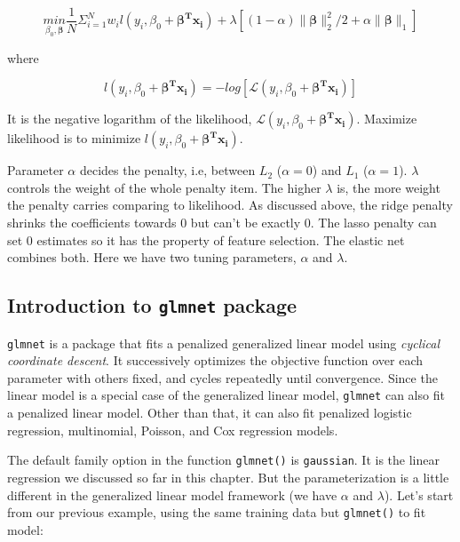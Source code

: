 \documentclass[
  12pt,
]{krantz}
\begin{document}
\[\underset{\beta_{0},\mathbf{\beta}}{min}\frac{1}{N}\Sigma_{i=1}^{N}w_{i}l(y_{i},\beta_{0}+\mathbf{\beta^{T}x_{i}})+\lambda[(1-\alpha)\parallel\mathbf{\beta}\parallel_{2}^{2}/2+\alpha\parallel\mathbf{\beta}\parallel_{1}]\]

where

\[l(y_{i},\beta_{0}+\mathbf{\beta^{T}x_{i}})=-log[\mathcal{L}(y_{i},\beta_{0}+\mathbf{\beta^{T}x_{i}})]\]

It is the negative logarithm of the likelihood, \(\mathcal{L}(y_{i},\beta_{0}+\mathbf{\beta^{T}x_{i}})\). Maximize likelihood is to minimize \(l(y_{i},\beta_{0}+\mathbf{\beta^{T}x_{i}})\).

Parameter \(\alpha\) decides the penalty, i.e, between \(L_2\) (\(\alpha=0\)) and \(L_1\) (\(\alpha=1\)). \(\lambda\) controls the weight of the whole penalty item. The higher \(\lambda\) is, the more weight the penalty carries comparing to likelihood. As discussed above, the ridge penalty shrinks the coefficients towards 0 but can't be exactly 0. The lasso penalty can set 0 estimates so it has the property of feature selection. The elastic net combines both. Here we have two tuning parameters, \(\alpha\) and \(\lambda\).

\hypertarget{introduction-to-glmnet-package}{%
\subsection{\texorpdfstring{Introduction to \texttt{glmnet} package}{Introduction to glmnet package}}\label{introduction-to-glmnet-package}}

\texttt{glmnet} is a package that fits a penalized generalized linear model using \emph{cyclical coordinate descent}. It successively optimizes the objective function over each parameter with others fixed, and cycles repeatedly until convergence. Since the linear model is a special case of the generalized linear model, \texttt{glmnet} can also fit a penalized linear model. Other than that, it can also fit penalized logistic regression, multinomial, Poisson, and Cox regression models.

The default family option in the function \texttt{glmnet()} is \texttt{gaussian}. It is the linear regression we discussed so far in this chapter. But the parameterization is a little different in the generalized linear model framework (we have \(\alpha\) and \(\lambda\)). Let's start from our previous example, using the same training data but \texttt{glmnet()} to fit model:
\end{document}
